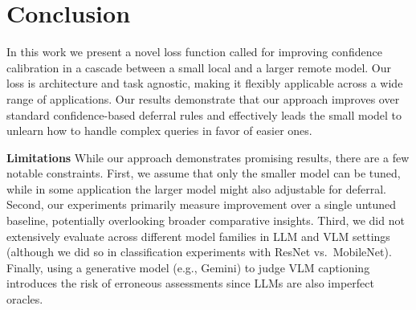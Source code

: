 \section{Conclusion}

In this work we present a novel loss function called \loss for improving confidence calibration in a cascade between a small local and a larger remote model. Our loss is architecture and task agnostic, making it flexibly applicable across a wide range of applications. Our results demonstrate that our approach improves over standard confidence-based deferral rules and effectively leads the small model to unlearn how to handle complex queries in favor of easier ones. 

\textbf{Limitations} While our approach demonstrates promising results, there are a few notable constraints. First, we assume that only the smaller model can be tuned, while in some application the larger model might also adjustable for deferral. Second, our experiments primarily measure improvement over a single untuned baseline, potentially overlooking broader comparative insights. Third, we did not extensively evaluate across different model families in LLM and VLM settings (although we did so in classification experiments with ResNet vs.\ MobileNet). Finally, using a generative model (e.g., Gemini) to judge VLM captioning introduces the risk of erroneous assessments since LLMs are also imperfect oracles.
